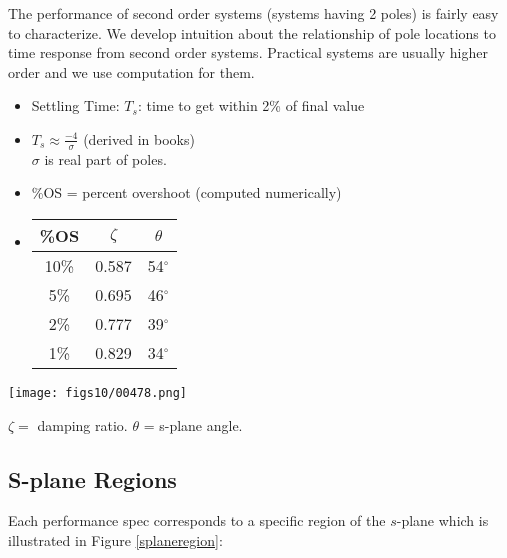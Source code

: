  The performance of second order systems (systems having 2 poles) is fairly easy to characterize.  We develop intuition about the relationship of pole locations to time response from second order systems.  Practical systems are usually higher order  and we use computation for them.	%



\begin{itemize}
	\item Settling Time: $T_s$: time to get within 2\% of final value
	\item $T_s \approx \frac{-4}{\sigma}$ (derived in books) \\
$\sigma$ is real part of poles.
	\item \%OS = percent overshoot  (computed numerically)
	\item 
	\begin{tabular}{c|c|c}
	\%OS	& $\zeta$	& $\theta$	\\\hline   
	10\%	& 0.587		& 54$^\circ$	\\
	 5\%	& 0.695		& 46$^\circ$	\\
	 2\%	& 0.777		& 39$^\circ$	\\
	 1\%	& 0.829		& 34$^\circ$	\\
	\end{tabular} 
\end{itemize}





 \texttt{[image: figs10/00478.png]}

 
  $\zeta =$ damping ratio.   $\theta$ = s-plane angle. \\[0.25in]

 
 

\subsection{S-plane Regions}



Each performance spec corresponds to a specific region of the $s$-plane which is illustrated in Figure \ref{splaneregion}:

